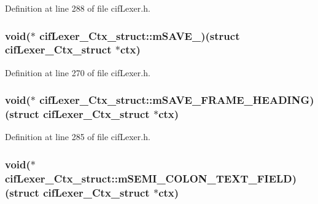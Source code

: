 Definition at line 288 of file cif\-Lexer.\-h.

\hypertarget{structcif_lexer___ctx__struct_a51609c9b67622c36fcd3f7c809279b61}{
\subsubsection[{m\-S\-A\-V\-E\-\_\-}]{\setlength{\rightskip}{0pt plus 5cm}void($\ast$ cif\-Lexer\-\_\-\-Ctx\-\_\-struct\-::m\-S\-A\-V\-E\-\_\-)(struct {\bf cif\-Lexer\-\_\-\-Ctx\-\_\-struct} $\ast$ctx)}}\label{structcif_lexer___ctx__struct_a51609c9b67622c36fcd3f7c809279b61}


Definition at line 270 of file cif\-Lexer.\-h.

\hypertarget{structcif_lexer___ctx__struct_a885e4f60e392f0ddd2844e67ba35082e}{
\subsubsection[{m\-S\-A\-V\-E\-\_\-\-F\-R\-A\-M\-E\-\_\-\-H\-E\-A\-D\-I\-N\-G}]{\setlength{\rightskip}{0pt plus 5cm}void($\ast$ cif\-Lexer\-\_\-\-Ctx\-\_\-struct\-::m\-S\-A\-V\-E\-\_\-\-F\-R\-A\-M\-E\-\_\-\-H\-E\-A\-D\-I\-N\-G)(struct {\bf cif\-Lexer\-\_\-\-Ctx\-\_\-struct} $\ast$ctx)}}\label{structcif_lexer___ctx__struct_a885e4f60e392f0ddd2844e67ba35082e}


Definition at line 285 of file cif\-Lexer.\-h.

\hypertarget{structcif_lexer___ctx__struct_a63825fecb7363d929bcc90bcad924f57}{
\subsubsection[{m\-S\-E\-M\-I\-\_\-\-C\-O\-L\-O\-N\-\_\-\-T\-E\-X\-T\-\_\-\-F\-I\-E\-L\-D}]{\setlength{\rightskip}{0pt plus 5cm}void($\ast$ cif\-Lexer\-\_\-\-Ctx\-\_\-struct\-::m\-S\-E\-M\-I\-\_\-\-C\-O\-L\-O\-N\-\_\-\-T\-E\-X\-T\-\_\-\-F\-I\-E\-L\-D)(struct {\bf cif\-Lexer\-\_\-\-Ctx\-\_\-struct} $\ast$ctx)}}\label{structcif_lexer___ctx__struct_a63825fecb7363d929bcc90bcad924f57}


